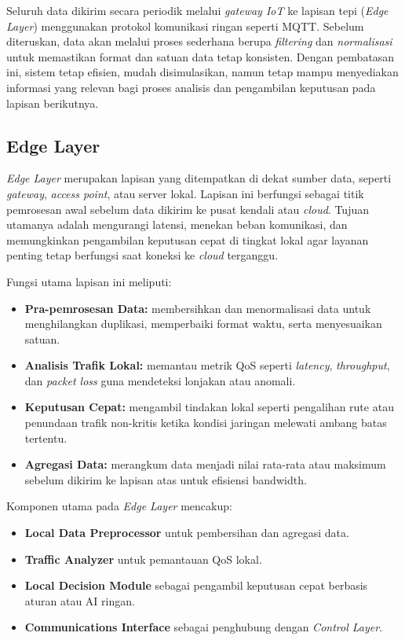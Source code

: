 \documentclass[a4paper,conference]{IEEEtran}
\begin{document}
Seluruh data dikirim secara periodik melalui \textit{gateway IoT} ke lapisan tepi (\textit{Edge Layer}) menggunakan protokol komunikasi ringan seperti MQTT. 
Sebelum diteruskan, data akan melalui proses sederhana berupa \textit{filtering} dan \textit{normalisasi} untuk memastikan format dan satuan data tetap konsisten. 
Dengan pembatasan ini, sistem tetap efisien, mudah disimulasikan, namun tetap mampu menyediakan informasi yang relevan bagi proses analisis dan pengambilan keputusan pada lapisan berikutnya.


\subsection{Edge Layer}

\textit{Edge Layer} merupakan lapisan yang ditempatkan di dekat sumber data, seperti \textit{gateway}, \textit{access point}, atau server lokal. 
Lapisan ini berfungsi sebagai titik pemrosesan awal sebelum data dikirim ke pusat kendali atau \textit{cloud}. 
Tujuan utamanya adalah mengurangi latensi, menekan beban komunikasi, dan memungkinkan pengambilan keputusan cepat di tingkat lokal agar layanan penting tetap berfungsi saat koneksi ke \textit{cloud} terganggu.

Fungsi utama lapisan ini meliputi:
\begin{itemize}
    \item \textbf{Pra-pemrosesan Data:} membersihkan dan menormalisasi data untuk menghilangkan duplikasi, memperbaiki format waktu, serta menyesuaikan satuan.
    \item \textbf{Analisis Trafik Lokal:} memantau metrik QoS seperti \textit{latency}, \textit{throughput}, dan \textit{packet loss} guna mendeteksi lonjakan atau anomali.
    \item \textbf{Keputusan Cepat:} mengambil tindakan lokal seperti pengalihan rute atau penundaan trafik non-kritis ketika kondisi jaringan melewati ambang batas tertentu.
    \item \textbf{Agregasi Data:} merangkum data menjadi nilai rata-rata atau maksimum sebelum dikirim ke lapisan atas untuk efisiensi bandwidth.
\end{itemize}

Komponen utama pada \textit{Edge Layer} mencakup:
\begin{itemize}
    \item \textbf{Local Data Preprocessor} untuk pembersihan dan agregasi data.
    \item \textbf{Traffic Analyzer} untuk pemantauan QoS lokal.
    \item \textbf{Local Decision Module} sebagai pengambil keputusan cepat berbasis aturan atau AI ringan.
    \item \textbf{Communications Interface} sebagai penghubung dengan \textit{Control Layer}.
\end{itemize}
\end{document}
